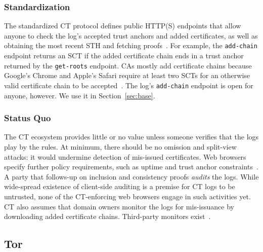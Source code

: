 \subsubsection{Standardization}
The standardized CT protocol defines public HTTP(S) endpoints that allow anyone
to check the log's accepted trust anchors and added certificates, as well as
obtaining the most recent STH and fetching proofs~\cite{ct,ct/bis}.  For
example, the \texttt{add-chain} endpoint returns an SCT if the added
certificate chain ends in a trust anchor returned by the \texttt{get-roots}
endpoint.  CAs mostly add certificate chains because Google's Chrome and
Apple's Safari require at least two SCTs for an otherwise valid certificate
chain to be accepted~\cite{chrome-policy,safari-policy}.  The log's
\texttt{add-chain} endpoint is open for anyone, however.  We use it in
Section~\ref{sec:base}.

\subsubsection{Status Quo}
The CT ecosystem provides little or no value unless someone verifies that the
logs play by the rules.  At minimum, there should be no omission and split-view
attacks:
	it would undermine detection of mis-issued certificates.
Web browsers specify further policy requirements, such as uptime and trust
anchor constraints~\cite{chrome-policy,safari-policy}.  A party that follows-up
on inclusion and consistency proofs \emph{audits} the logs.  While 
wide-spread existence of client-side auditing is a premise for CT logs to be
untrusted, none of the CT-enforcing web browsers engage in such activities yet.
CT also assumes that domain owners monitor the logs for mis-issuance by
downloading added certificate chains.  Third-party monitors
exist~\cite{ct-monitors}.

\subsection{Tor} \label{sec:background:tor}

